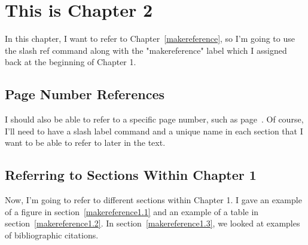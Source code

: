 
\cleardoublepage


\chapter{This is Chapter 2}
\label{makereference2}

In this chapter, I want to refer to Chapter~\ref{makereference},
so I'm going to use the slash ref command along with the
"makereference" label which I assigned back at the beginning of
Chapter 1.

\section{Page Number References}
\label{makereference2.1} I should also be able to refer to a
specific page number, such as page~\pageref{makereference}.  Of
course, I'll need to have a slash label command and a unique name
in each section that I want to be able to refer to later in the
text.

\section{Referring to Sections Within Chapter 1}
\label{makereference2.2} Now, I'm going to refer to different
sections within Chapter 1. I gave an example of a figure in
section~\ref{makereference1.1} and an example of a table in
section~\ref{makereference1.2}.  In
section~\ref{makereference1.3}, we looked at examples of
bibliographic citations.
